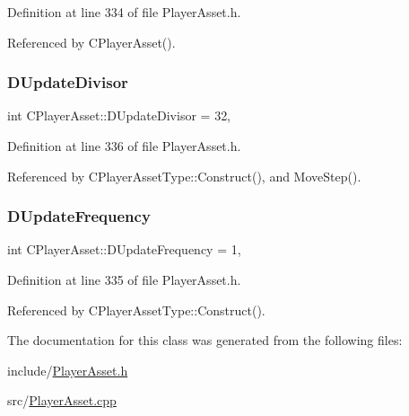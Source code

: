 Definition at line 334 of file Player\+Asset.\+h.



Referenced by C\+Player\+Asset().

\hypertarget{classCPlayerAsset_a09d17faf2ad70e2f778095a3c314d398}{}\label{classCPlayerAsset_a09d17faf2ad70e2f778095a3c314d398} 
\subsubsection{\texorpdfstring{D\+Update\+Divisor}{DUpdateDivisor}}
{\footnotesize\ttfamily int C\+Player\+Asset\+::\+D\+Update\+Divisor = 32\hspace{0.3cm}{\ttfamily [static]}, {\ttfamily [protected]}}



Definition at line 336 of file Player\+Asset.\+h.



Referenced by C\+Player\+Asset\+Type\+::\+Construct(), and Move\+Step().

\hypertarget{classCPlayerAsset_ade2147d67ec25b0280d5f11a89dd0dc5}{}\label{classCPlayerAsset_ade2147d67ec25b0280d5f11a89dd0dc5} 
\subsubsection{\texorpdfstring{D\+Update\+Frequency}{DUpdateFrequency}}
{\footnotesize\ttfamily int C\+Player\+Asset\+::\+D\+Update\+Frequency = 1\hspace{0.3cm}{\ttfamily [static]}, {\ttfamily [protected]}}



Definition at line 335 of file Player\+Asset.\+h.



Referenced by C\+Player\+Asset\+Type\+::\+Construct().



The documentation for this class was generated from the following files\+:\begin{DoxyCompactItemize}
\item 
include/\hyperlink{PlayerAsset_8h}{Player\+Asset.\+h}\item 
src/\hyperlink{PlayerAsset_8cpp}{Player\+Asset.\+cpp}\end{DoxyCompactItemize}
